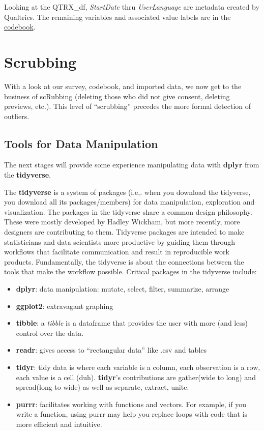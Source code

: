 \documentclass[
  11pt,
]{book}
\providecommand{\tightlist}{%
  \setlength{\itemsep}{0pt}\setlength{\parskip}{0pt}}
\begin{document}
Looking at the QTRX\_df, \emph{StartDate} thru \emph{UserLanguage} are metadata created by Qualtrics. The remaining variables and associated value labels are in the \href{./Rate-a-Course_Codebook.pdf}{codebook}.

\hypertarget{scrubbing}{%
\section{Scrubbing}\label{scrubbing}}

With a look at our survey, codebook, and imported data, we now get to the business of scRubbing (deleting those who did not give consent, deleting previews, etc.). This level of ``scrubbing'' precedes the more formal detection of outliers.

\hypertarget{tools-for-data-manipulation}{%
\subsection{Tools for Data Manipulation}\label{tools-for-data-manipulation}}

The next stages will provide some experience manipulating data with \textbf{dplyr} from the \textbf{tidyverse}.

The \textbf{tidyverse} is a system of packages (i.e,. when you download the tidyverse, you download all its packages/members) for data manipulation, exploration and visualization. The packages in the tidyverse share a common design philosophy. These were mostly developed by Hadley Wickham, but more recently, more designers are contributing to them. Tidyverse packages are intended to make statisticians and data scientists more productive by guiding them through workflows that facilitate communication and result in reproducible work products. Fundamentally, the tidyverse is about the connections between the tools that make the workflow possible. Critical packages in the tidyverse include:

\begin{itemize}
\tightlist
\item
  \textbf{dplyr}: data manipulation: mutate, select, filter, summarize, arrange
\item
  \textbf{ggplot2}: extravagant graphing
\item
  \textbf{tibble}: a \emph{tibble} is a dataframe that provides the user with more (and less) control over the data.
\item
  \textbf{readr}: gives access to ``rectangular data'' like .csv and tables
\item
  \textbf{tidyr}: tidy data is where each variable is a column, each observation is a row, each value is a cell (duh). \textbf{tidyr}'s contributions are gather(wide to long) and spread(long to wide) as well as separate, extract, unite.
\item
  \textbf{purrr}: facilitates working with functions and vectors. For example, if you write a function, using purrr may help you replace loops with code that is more efficient and intuitive.
\end{itemize}
\end{document}
